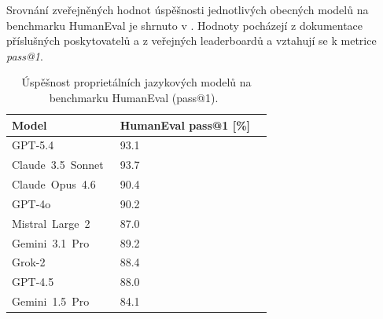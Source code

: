 Srovnání zveřejněných hodnot úspěšnosti jednotlivých obecných modelů na benchmarku HumanEval je shrnuto v .
Hodnoty pocházejí z dokumentace příslušných poskytovatelů a z veřejných leaderboardů a vztahují se k metrice \textit{pass@1}.

\begin{table}[H]
    \centering
    \begin{tabular}{llr}
        \toprule
        \textbf{Model}                         & \textbf{HumanEval pass@1 [\%]} \\
        \midrule
        GPT-5.4~\cite{gpt-5.4}                 & 93.1                           \\
        Claude~3.5~Sonnet~\cite{claude-3.5}    & 93.7                           \\
        Claude~Opus~4.6~\cite{claude-opus-4.6} & 90.4                           \\
        GPT-4o~\cite{gpt-4o}                   & 90.2                           \\
        Mistral~Large~2~\cite{mistral-large-2} & 87.0                           \\
        Gemini~3.1~Pro~\cite{geminy-3.1-pro}   & 89.2                           \\
        Grok-2~\cite{grok-2}                   & 88.4                           \\
        GPT-4.5~\cite{gpt-4.5}                 & 88.0                           \\
        Gemini~1.5~Pro~\cite{gemini-1.5-pro}   & 84.1                           \\
        \bottomrule
    \end{tabular}
    \caption[Úspěšnost proprietálních jazykových modelů na benchmarku HumanEval (pass@1).]{Úspěšnost proprietálních jazykových modelů na benchmarku HumanEval (pass@1).~\cite{llm-stats-humaneval}}
    \label{tab:humaneval-general-models}
\end{table}

\endinput